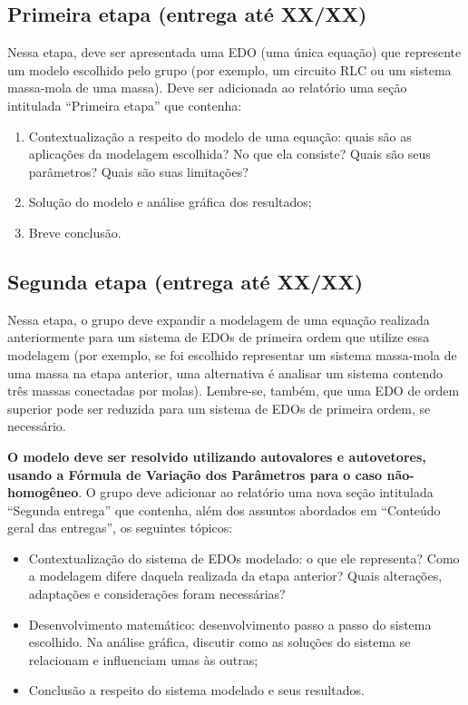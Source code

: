 \documentclass[oneside,12pt,a4paper]{article}
\begin{document}
    \subsection{Primeira etapa (entrega até XX/XX)}

    Nessa etapa, deve ser apresentada uma EDO (uma única equação) que represente um modelo escolhido pelo grupo (por exemplo, um circuito RLC ou um sistema massa-mola de uma massa). Deve ser adicionada ao relatório uma seção intitulada ``Primeira etapa'' que contenha:
    \begin{enumerate}
        \item Contextualização a respeito do modelo de uma equação: quais são as aplicações da modelagem escolhida? No que ela consiste? Quais são seus parâmetros? Quais são suas limitações? 
        \item Solução do modelo e análise gráfica dos resultados; 
        \item Breve conclusão.
    \end{enumerate}

    \subsection{Segunda etapa (entrega até XX/XX)}

    Nessa etapa, o grupo deve expandir a modelagem de uma equação realizada anteriormente para um sistema de EDOs de primeira ordem que utilize essa modelagem (por exemplo, se foi escolhido representar um sistema massa-mola de uma massa na etapa anterior, uma alternativa é analisar um sistema contendo três massas conectadas por molas). Lembre-se, também, que uma EDO de ordem superior pode ser reduzida para um sistema de EDOs de primeira ordem, se necessário. 
    
    \textbf{O modelo deve ser resolvido utilizando autovalores e autovetores, usando a Fórmula de Variação dos Parâmetros para o caso não-homogêneo}. O grupo deve adicionar ao relatório uma nova seção intitulada ``Segunda entrega'' que contenha, além dos assuntos abordados em ``Conteúdo geral das entregas'', os seguintes tópicos:
    \begin{itemize}
        \item Contextualização do sistema de EDOs modelado: o que ele representa? Como a modelagem difere daquela realizada da etapa anterior? Quais alterações, adaptações e considerações foram necessárias?
        \item Desenvolvimento matemático: desenvolvimento passo a passo do sistema escolhido. Na análise gráfica, discutir como as soluções do sistema se relacionam e influenciam umas às outras;
        \item Conclusão a respeito do sistema modelado e seus resultados.
    \end{itemize}
\end{document}
